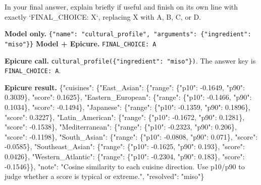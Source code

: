 In your final answer, explain briefly if useful and finish on its own line with exactly `FINAL\_CHOICE: X`, replacing X with A, B, C, or D.

\textbf{Model only.} \texttt{\{"name": "cultural\_profile", "arguments": \{"ingredient": "miso"\}\}} \quad \textbf{Model + Epicure.} \texttt{FINAL\_CHOICE: A}

\textbf{Epicure call.} \texttt{cultural\_profile}\allowbreak\texttt{(\{"ingredient": "miso"\})}. The answer key is \texttt{FINAL\_CHOICE: A}.

\textbf{Epicure result.} {\ttfamily\footnotesize\sloppy \{"cuisines": \{"East\_Asian": \{"range": \{"p10": -0.1649, "p90": 0.3039\}, "score": 0.1625\}, "Eastern\_European": \{"range": \{"p10": -0.1466, "p90": 0.1034\}, "score": -0.1494\}, "Japanese": \{"range": \{"p10": -0.1359, "p90": 0.1896\}, "score": 0.3227\}, "Latin\_American": \{"range": \{"p10": -0.1672, "p90": 0.1281\}, "score": -0.1538\}, "Mediterranean": \{"range": \{"p10": -0.2323, "p90": 0.206\}, "score": -0.1198\}, "South\_Asian": \{"range": \{"p10": -0.0808, "p90": 0.071\}, "score": -0.0585\}, "Southeast\_Asian": \{"range": \{"p10": -0.1625, "p90": 0.193\}, "score": 0.0426\}, "Western\_Atlantic": \{"range": \{"p10": -0.2304, "p90": 0.183\}, "score": -0.1546\}\}, "note": "Cosine similarity to each cuisine direction. Use p10/p90 to judge whether a score is typical or extreme.", "resolved": "miso"\}}
